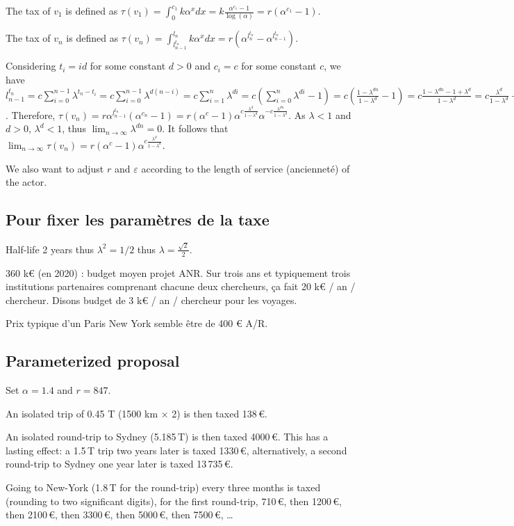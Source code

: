 \documentclass[version=3.21, pagesize, twoside=off, bibliography=totoc, DIV=calc, fontsize=12pt, a4paper, french, english]{scrartcl}
\begin{document}
The tax of $v_1$ is defined as $\tau(v_1) = \int_0^{c_1} k α^x dx = k \frac{α^{c_1} - 1}{\log(α)} = r (α^{c_1} - 1)$.

The tax of $v_n$ is defined as $\tau(v_n) = \int_{l_{n - 1}^{t_n}}^{l_n} k α^x dx = r (α^{l_n^{t_n}} - α^{l_{n - 1}^{t_n}})$.

Considering $t_i = id$ for some constant $d > 0$ and $c_i = c$ for some constant $c$, we have $l_{n - 1}^{t_n} = c \sum_{i = 0}^{n - 1} \lambda^{t_n - t_i} = c \sum_{i = 0}^{n - 1} \lambda^{d(n - i)} = c \sum_{i = 1}^n \lambda^{di} = c (\sum_{i = 0}^n \lambda^{di} - 1) = c (\frac{1 - λ^{dn}}{1 - λ^d} - 1) = c \frac{1 - λ^{dn} - 1 + λ^d}{1 - λ^d} = c \frac{λ^d}{1 - λ^d} - c \frac{λ^{dn}}{1 - λ^d}$. 
Therefore, $τ(v_n) 
= r α^{l_{n - 1}^{t_n}} (α^{c_n} - 1) 
= r (α^c - 1) α^{c \frac{λ^d}{1 - λ^d}} α^{- c \frac{λ^{dn}}{1 - λ^d}}$.
As $λ < 1$ and $d > 0$, $λ^d < 1$, thus $\lim_{n → ∞} λ^{dn} = 0$. 
It follows that $\lim_{n → ∞} τ(v_n) = r (α^c - 1) α^{c \frac{λ^d}{1 - λ^d}}$.

We also want to adjust $r$ and $ε$ according to the length of service (ancienneté) of the actor.

\subsection{Pour fixer les paramètres de la taxe}
Half-life 2 years thus $λ^2 = 1/2$ thus $λ = \frac{\sqrt{2}}{2}$.

360 k€ (en 2020) : budget moyen projet ANR. Sur trois ans et typiquement trois institutions partenaires comprenant chacune deux chercheurs, ça fait 20 k€ / an / chercheur. Disons budget de 3 k€ / an / chercheur pour les voyages.

Prix typique d’un Paris New York semble être de 400 € A/R.

\subsection{Parameterized proposal}
Set $α = 1.4$ and $r = 847$.

An isolated trip of 0.45 T (1500 km × 2)  is then taxed 138\,€.

An isolated round-trip to Sydney (5.185\,T) is then taxed 4000\,€. This has a lasting effect: a 1.5\,T trip two years later is taxed 1330\,€, alternatively, a second round-trip to Sydney one year later is taxed 13\,735\,€.

Going to New-York (1.8\,T for the round-trip) every three months is taxed (rounding to two significant digits), for the first round-trip, 710\,€, then 1200\,€, then 2100\,€, then 3300\,€, then 5000\,€, then 7500\,€, …
\end{document}
